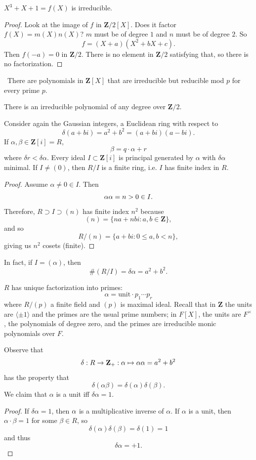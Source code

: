 \documentclass[11pt, oneside]{amsart}
\numberwithin{equation}{section}
\numberwithin{theorem}{section}
\theoremstyle{definition}
\let\bar\relax
\def\Z{\mathbf{Z}}
\begin{document}
{$X^3 + X + 1 =f(X)$ is irreducible.
\begin{proof}
Look at the image of $f$ in $\Z/2[X]$. Does it factor $f(X) = m(X)n(X)$? $m$ must be of degree $1$ and $n$ must be of degree $2$. So 
$$
f = (X+a)(X^2+bX+c).
$$
Then $f(-a) = 0$ in $\Z/2$. There is no element in $\Z/2$ satisfying that, so there is no factorization. 
\end{proof}
\noindent\hspace*{-23pt} \dbend\ There are polynomials in $\Z[X]$ that are irreducible but reducible mod $p$ for every prime $p$.

There is an irreducible polynomial of any degree over $\Z/2$.

Consider again the Gaussian integers, a Euclidean ring with respect to
$$
\delta(a+bi) = a^2 + b^2 = (a+bi)(a-bi).
$$
If $\alpha,\beta\in \Z[i] = R$,
$$
\beta = q\cdot\alpha + r
$$
where $\delta r < \delta \alpha$. Every ideal $I\subset \Z[i]$ is principal generated by $\alpha$ with $\delta\alpha$ minimal. If $I\neq (0)$, then $R/I$ is a finite ring, i.e. $I$ has finite index in $R$.
\begin{proof}
Assume $\alpha\neq 0 \in I$. Then
$$
\alpha\bar\alpha = n>0\in I.
$$
Therefore, $R\supset I\supset (n)$ has finite index $n^2$ because 
$$
(n) = \{ na+nbi : a,b\in \Z\},
$$
and so 
$$
R/(n) = \{a+bi : 0\leqslant a,b < n\},
$$
giving us $n^2$ cosets (finite).
\end{proof}

In fact, if $I=(\alpha)$, then 
$$
\# (R/I) = \delta\alpha = a^2+b^2.
$$ 

$R$ has unique factorization into primes:
$$
\alpha = \mathrm{unit}\cdot p_1\cdots p_r
$$
where $R/(p)$ a finite field and $(p)$ is maximal ideal. Recall that in $\Z$ the units are $\langle \pm 1\rangle$ and the primes are the usual prime numbers; in $F[X]$, the units are $F^\times$, the polynomials of degree zero, and the primes are irreducible monic polynomials over $F$. 

Observe that 
$$
\delta : R\to\Z_+ : \alpha\mapsto\alpha\bar\alpha=a^2+b^2
$$
has the property that 
$$
\delta(\alpha\beta) = \delta(\alpha)\delta(\beta).
$$
We claim that $\alpha$ is a unit iff $\delta \alpha =1$.
\begin{proof}
If $\delta \alpha =1$, then $\bar\alpha$ is a multiplicative inverse of $\alpha$. If $\alpha$ is a unit, then $\alpha\cdot\beta=1$ for some $\beta\in R$, so 
$$
\delta(\alpha)\delta(\beta) = \delta(1) = 1
$$
and thus
$$
\delta \alpha = +1.
$$
\end{proof}

}
\end{document}

